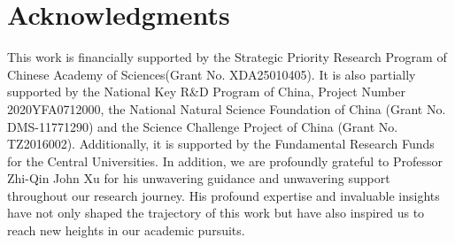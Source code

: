 \documentclass{article}
\begin{document}
\section*{Acknowledgments}
This work is financially supported by the Strategic Priority Research Program of Chinese Academy of Sciences(Grant No. XDA25010405). It is also partially  supported by the National Key R\&D Program of China, Project Number 2020YFA0712000, the National Natural Science Foundation of China (Grant No. DMS-11771290) and the Science Challenge Project of China (Grant No. TZ2016002). Additionally, it is supported by the Fundamental Research Funds for the Central Universities. In addition, we are profoundly grateful to Professor Zhi-Qin John Xu for his unwavering guidance and unwavering support throughout our research journey. His profound expertise and invaluable insights have not only shaped the trajectory of this work but have also inspired us to reach new heights in our academic pursuits.

\newpage




\newpage

\appendix
\end{document}
